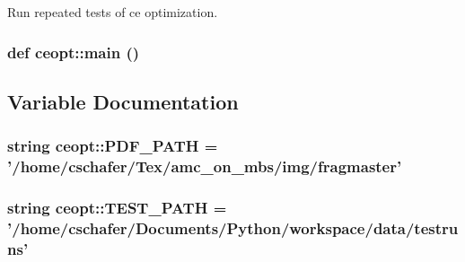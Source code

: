 Run repeated tests of ce optimization. 

\hypertarget{namespaceceopt_070fc29c5e852338e3352b09633c4fd3}{
\subsubsection[{main}]{\setlength{\rightskip}{0pt plus 5cm}def ceopt::main ()}}
\label{namespaceceopt_070fc29c5e852338e3352b09633c4fd3}




\subsection{Variable Documentation}
\hypertarget{namespaceceopt_cbf36072c5792daee6740a457808e012}{
\subsubsection[{PDF\_\-PATH}]{\setlength{\rightskip}{0pt plus 5cm}string {\bf ceopt::PDF\_\-PATH} = '/home/cschafer/Tex/amc\_\-on\_\-mbs/img/fragmaster'}}
\label{namespaceceopt_cbf36072c5792daee6740a457808e012}


\hypertarget{namespaceceopt_909c15e21c1762433b80d29c7a095bc9}{
\subsubsection[{TEST\_\-PATH}]{\setlength{\rightskip}{0pt plus 5cm}string {\bf ceopt::TEST\_\-PATH} = '/home/cschafer/Documents/Python/workspace/{\bf data}/testruns'}}
\label{namespaceceopt_909c15e21c1762433b80d29c7a095bc9}


